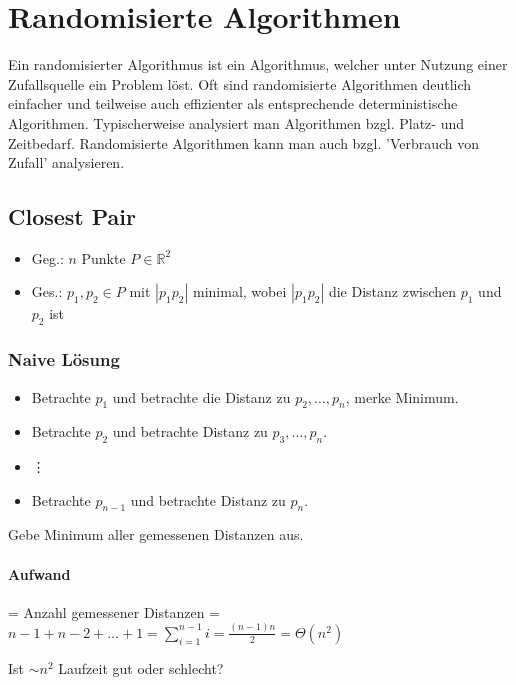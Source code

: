 \section{Randomisierte Algorithmen}
Ein randomisierter Algorithmus ist ein Algorithmus, welcher unter Nutzung einer Zufallsquelle ein Problem löst. Oft sind randomisierte Algorithmen deutlich einfacher und teilweise auch effizienter als entsprechende deterministische Algorithmen. Typischerweise analysiert man Algorithmen bzgl. Platz- und Zeitbedarf. Randomisierte Algorithmen kann man auch bzgl. 'Verbrauch von Zufall' analysieren.


\subsection{Closest Pair}
\begin{itemize}
	\item[] Geg.: $n$ Punkte $P \in \mathbb{R}^2$
	\item[]Ges.: $p_1,p_2 \in P$ mit $|p_1 p_2|$ minimal, wobei $|p_1 p_2|$ die Distanz zwischen $p_1$ und $p_2$ ist
\end{itemize}


\subsubsection{Naive Lösung}
\begin{itemize}
	\item[] Betrachte $p_1$ und betrachte die Distanz zu $p_2,\dots,p_n$, merke Minimum.
	\item[] Betrachte $p_2$ und betrachte Distanz zu $p_3,\dots,p_n$.
	\item[] \hspace{1cm}\vdots
	\item[] Betrachte $p_{n-1}$ und betrachte Distanz zu $p_n$.
\end{itemize}

\par\medskip
Gebe Minimum aller gemessenen Distanzen aus.
\par\medskip

\paragraph*{Aufwand} = Anzahl gemessener Distanzen = $n-1 + n-2 + \dots + 1 = \sum\limits_{i=1}^{n-1} i = \frac{(n-1)n}{2} = \Theta(n^2)$
 
\par\medskip
Ist $\sim n^2$ Laufzeit gut oder schlecht?
\par\medskip

